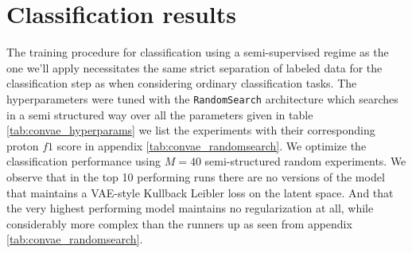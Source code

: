 \chapter{Classification results}

The training procedure for classification using a semi-supervised regime as the one we'll apply necessitates the same strict separation of labeled data for the classification step as when considering ordinary classification tasks. The hyperparameters were tuned with the \lstinline{RandomSearch} architecture which searches in a semi structured way over all the parameters given in table \ref{tab:convae_hyperparams} we list the experiments with their corresponding proton $f1$ score in appendix \ref{tab:convae_randomsearch}. We optimize the classification performance using $M=40$ semi-structured random experiments. We observe that in the top 10 performing runs there are no versions of the model that maintains a VAE-style Kullback Leibler loss on the latent space. And that the very highest performing model maintains no regularization at all, while considerably more complex than the runners up as seen from appendix \ref{tab:convae_randomsearch}.
